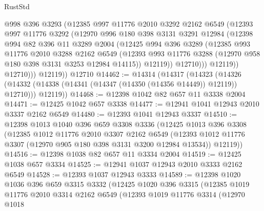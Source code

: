 \begin{lexlean}{RustStd}
\begin{coremodule}
                @998
                @396
                @3293
                (@12385
                  @997
                  @11776
                  @2010
                  @3292
                  @2162
                  @6549
                  (@12393
                    @997
                    @11776
                    @3292
                    (@12970
                      @996
                      @180
                      @398
                      @3131
                      @3291
                      @12984
                      (@12398
                        @994
                        @82
                        @396
                        @11
                        @3289
                        @2004
                        (@12425
                          @994
                          @396
                          @3289
                          (@12385
                            @993
                            @11776
                            @2010
                            @3288
                            @2162
                            @6549
                            (@12393
                              @993
                              @11776
                              @3288
                              (@12970 @958 @180 @398 @3131 @3253 @12984 @14115))
                            @12119))
                        @12710)))
                  @12119))
              @12710)))
        @12119))
    @12710
@14462 := @14314
    (@14317
      (@14323
        (@14326 (@14332 (@14338 (@14341 (@14347 (@14350 (@14356 @14449)) @12119)) @12710)))
        @12119))
@14468 := @12398 @1042 @82 @657 @11 @3338 @2004
@14471 := @12425 @1042 @657 @3338
@14477 := @12941 @1041 @12943 @2010 @3337 @2162 @6549
@14480 := @12393 @1041 @12943 @3337
@14510 := @12398
    @1013
    @1040
    @396
    @659
    @3308
    @3336
    (@12425
      @1013
      @396
      @3308
      (@12385
        @1012
        @11776
        @2010
        @3307
        @2162
        @6549
        (@12393 @1012 @11776 @3307 (@12970 @905 @180 @398 @3131 @3200 @12984 @13534))
        @12119))
@14516 := @12398 @1038 @82 @657 @11 @3334 @2004
@14519 := @12425 @1038 @657 @3334
@14525 := @12941 @1037 @12943 @2010 @3333 @2162 @6549
@14528 := @12393 @1037 @12943 @3333
@14589 := @12398
    @1020
    @1036
    @396
    @659
    @3315
    @3332
    (@12425
      @1020
      @396
      @3315
      (@12385
        @1019
        @11776
        @2010
        @3314
        @2162
        @6549
        (@12393
          @1019
          @11776
          @3314
          (@12970
            @1018

\end{coremodule}
\end{lexlean}

